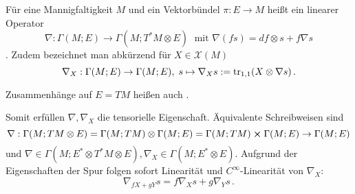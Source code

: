 


\begin{defi}[Zusammenhang]\label{defi:zsmhang}
Für eine Mannigfaltigkeit $M$ und ein Vektorbündel $\pi: E \rightarrow M$ heißt ein linearer Operator
\begin{equation}
\nabla: \Gamma(M; E) \rightarrow \Gamma(M; T^* M \otimes E) \; \text{ mit } \nabla(fs) = df \otimes s + f \nabla s
\end{equation}
. Zudem bezeichnet man abkürzend für $X \in \mathcal{X}(M)$
\begin{equation}
\nabla_X: \Gamma(M; E) \rightarrow \Gamma(M; E), \; s \mapsto \nabla_X s := \tr_{1, 1}(X \otimes \nabla s) \, .
\end{equation}

Zusammenhänge auf $E = TM$ heißen auch .
\end{defi}


Somit erfüllen $\nabla, \nabla_X$ die tensorielle Eigenschaft. Äquivalente Schreibweisen sind
\begin{equation*}
\nabla: \Gamma(M; TM \otimes E) = \Gamma(M; TM) \otimes \Gamma(M; E) = \Gamma(M; TM) \cross \Gamma(M; E) \rightarrow \Gamma(M; E)
\end{equation*}
und $\nabla \in \Gamma(M; E^* \otimes T^*M \otimes E), \nabla_X \in \Gamma(M; E^* \otimes E)$. Aufgrund der Eigenschaften der Spur folgen sofort Linearität und $C^\infty$-Linearität von $\nabla_X$:
\begin{equation}
\nabla_{f X + g Y} s = f \nabla_X s + g \nabla_Y s \, .
\end{equation}

